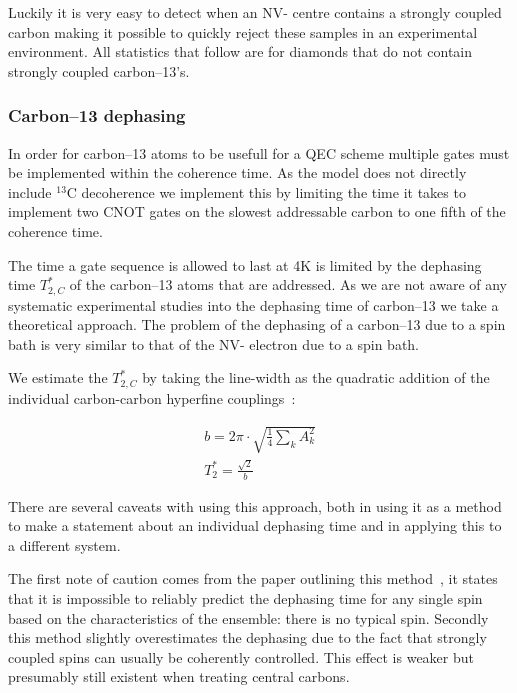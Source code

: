 Luckily it is very easy to detect when an NV- centre contains a strongly coupled carbon making it possible to quickly reject these samples in an experimental environment. All statistics that follow are for diamonds that do not contain strongly coupled carbon--13's. 

\subsubsection{Carbon--13 dephasing}
\label{carbon-13dephasing}

In order for carbon--13 atoms to be usefull for a QEC scheme multiple gates must be implemented within the coherence time. As the model does not directly include $^{13}\mathrm{C}$ decoherence we implement this by limiting the time it takes to implement two CNOT gates on the slowest addressable carbon to one fifth of the coherence time. 

The time a gate sequence is allowed to last at 4K is limited by the dephasing time  $T_{2,C}^* $ of the carbon--13 atoms that are addressed. As we are not aware of any systematic experimental studies into the dephasing time of carbon--13 we take a theoretical approach. The problem of the dephasing of a carbon--13 due to a spin bath is very similar to that of the NV- electron due to a spin bath. 

We estimate the  $T_{2,C}^* $ by taking the line-width as the quadratic addition of the individual carbon-carbon hyperfine couplings~\citep{Dobrovitski2008}:

\begin{eqnarray}
b = 2  \pi\cdot \sqrt{ \frac{1}{4} \sum _k A_k ^2}\\
T_2^* = \frac{\sqrt{2}}{b} 
\end{eqnarray}
 

There are several caveats with using this approach, both in using it as a method to make a statement about an individual dephasing time and in applying this to a different system. 

The first note of caution comes from the paper outlining this method~\citep{Dobrovitski2008}, it states that it is impossible to reliably predict the dephasing time for any single spin based on the characteristics of the ensemble: there is no typical spin. Secondly this method slightly overestimates the dephasing due to the fact that strongly coupled spins can usually be coherently controlled. This effect is weaker but presumably still existent when treating central carbons. 

